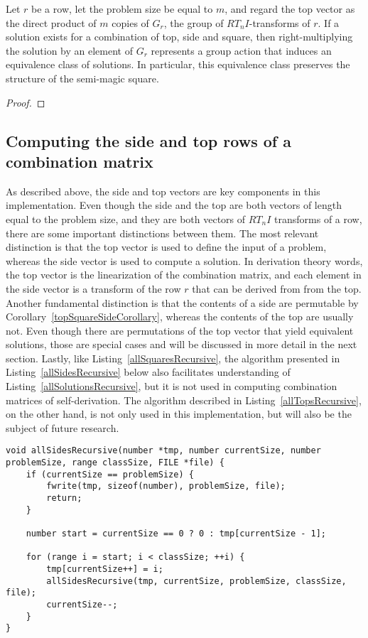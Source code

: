 \begin{corollary}
    Let $r$ be a row, let the problem size be equal to $m$, and regard the top vector as the direct product of $m$ copies of $G_r$, the group of $RT_nI$-transforms of $r$. If a solution exists for a combination of top, side and square, then right-multiplying the solution by an element of $G_r$ represents a group action that induces an equivalence class of solutions. In particular, this equivalence class preserves the structure of the semi-magic square.
    \begin{proof}
    \end{proof}
\end{corollary}

\subsection{Computing the side and top rows of a combination matrix}

As described above, the side and top vectors are key components in this implementation. Even though the side and the top are both vectors of length equal to the problem size, and they are both vectors of $RT_nI$ transforms of a row, there are some important distinctions between them. The most relevant distinction is that the top vector is used to define the input of a problem, whereas the side vector is used to compute a solution. In derivation theory words, the top vector is the linearization of the combination matrix, and each element in the side vector is a transform of the row $r$ that can be derived from from the top. Another fundamental distinction is that the contents of a side are permutable by Corollary~\ref{topSquareSideCorollary}, whereas the contents of the top are usually not. Even though there are permutations of the top vector that yield equivalent solutions, those are special cases and will be discussed in more detail in the next section. Lastly, like Listing~\ref{allSquaresRecursive}, the algorithm presented in Listing~\ref{allSidesRecursive} below also facilitates understanding of Listing~\ref{allSolutionsRecursive}, but it is not used in computing combination matrices of self-derivation. The algorithm described in Listing~\ref{allTopsRecursive}, on the other hand, is not only used in this implementation, but will also be the subject of future research.

\begin{lstlisting}[caption={Recursively computing all side vectors of a certain size.},label={allSidesRecursive}]
void allSidesRecursive(number *tmp, number currentSize, number problemSize, range classSize, FILE *file) {
    if (currentSize == problemSize) {
        fwrite(tmp, sizeof(number), problemSize, file);
        return;
    }

    number start = currentSize == 0 ? 0 : tmp[currentSize - 1];

    for (range i = start; i < classSize; ++i) {
        tmp[currentSize++] = i;
        allSidesRecursive(tmp, currentSize, problemSize, classSize, file);
        currentSize--;
    }
}
\end{lstlisting}

